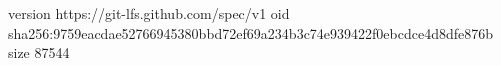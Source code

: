 version https://git-lfs.github.com/spec/v1
oid sha256:9759eacdae52766945380bbd72ef69a234b3c74e939422f0ebcdce4d8dfe876b
size 87544
